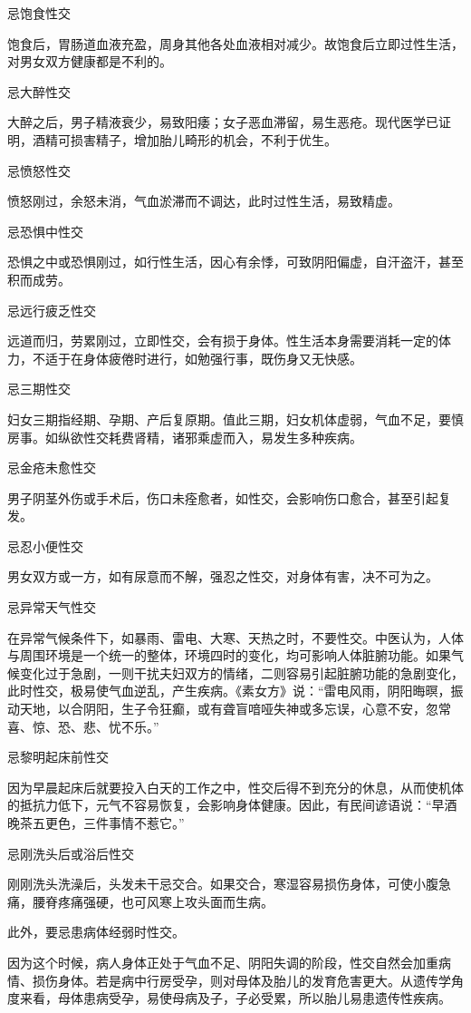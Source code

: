 \documentclass[12pt,UTF8]{ctexbook}
\begin{document}
忌饱食性交

饱食后，胃肠道血液充盈，周身其他各处血液相对减少。故饱食后立即过性生活，对男女双方健康都是不利的。

忌大醉性交

大醉之后，男子精液衰少，易致阳痿；女子恶血滞留，易生恶疮。现代医学已证明，酒精可损害精子，增加胎儿畸形的机会，不利于优生。

忌愤怒性交

愤怒刚过，余怒未消，气血淤滞而不调达，此时过性生活，易致精虚。

忌恐惧中性交

恐惧之中或恐惧刚过，如行性生活，因心有余悸，可致阴阳偏虚，自汗盗汗，甚至积而成劳。

忌远行疲乏性交

远道而归，劳累刚过，立即性交，会有损于身体。性生活本身需要消耗一定的体力，不适于在身体疲倦时进行，如勉强行事，既伤身又无快感。

忌三期性交

妇女三期指经期、孕期、产后复原期。值此三期，妇女机体虚弱，气血不足，要慎房事。如纵欲性交耗费肾精，诸邪乘虚而入，易发生多种疾病。

忌金疮未愈性交

男子阴茎外伤或手术后，伤口未痊愈者，如性交，会影响伤口愈合，甚至引起复发。

忌忍小便性交

男女双方或一方，如有尿意而不解，强忍之性交，对身体有害，决不可为之。

忌异常天气性交

在异常气候条件下，如暴雨、雷电、大寒、天热之时，不要性交。中医认为，人体与周围环境是一个统一的整体，环境四时的变化，均可影响人体脏腑功能。如果气候变化过于急剧，一则干扰夫妇双方的情绪，二则容易引起脏腑功能的急剧变化，此时性交，极易使气血逆乱，产生疾病。《素女方》说：“雷电风雨，阴阳晦暝，振动天地，以合阴阳，生子令狂癫，或有聋盲喑哑失神或多忘误，心意不安，忽常喜、惊、恐、悲、忧不乐。”

忌黎明起床前性交

因为早晨起床后就要投入白天的工作之中，性交后得不到充分的休息，从而使机体的抵抗力低下，元气不容易恢复，会影响身体健康。因此，有民间谚语说：“早酒晚茶五更色，三件事情不惹它。”

忌刚洗头后或浴后性交

刚刚洗头洗澡后，头发未干忌交合。如果交合，寒湿容易损伤身体，可使小腹急痛，腰脊疼痛强硬，也可风寒上攻头面而生病。

此外，要忌患病体经弱时性交。

因为这个时候，病人身体正处于气血不足、阴阳失调的阶段，性交自然会加重病情、损伤身体。若是病中行房受孕，则对母体及胎儿的发育危害更大。从遗传学角度来看，母体患病受孕，易使母病及子，子必受累，所以胎儿易患遗传性疾病。
\end{document}
